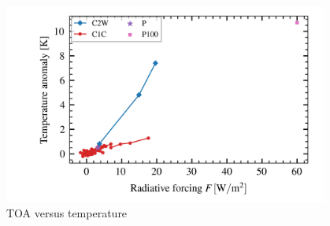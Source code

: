 \documentclass{ametsocV5}
\begin{document}
\begin{figure}
	\begin{center}
		\includegraphics[width=0.95\textwidth]{figures/toa_vs_temperature.png}
	\end{center}
	\caption{TOA versus temperature}
	\label{fig:toa_vs_temp}
\end{figure}

\clearpage




\end{document}
